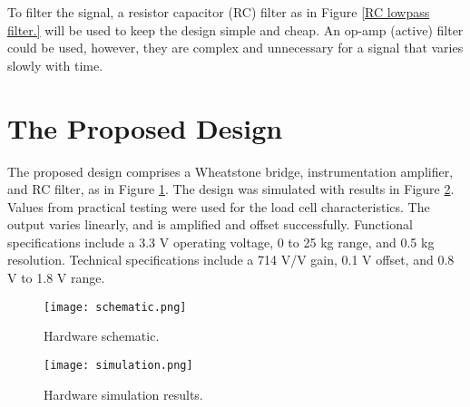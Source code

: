 To filter the signal, a resistor capacitor (RC) filter as in Figure \ref{RC lowpass filter.} will be used to keep the design simple and cheap. An op-amp (active) filter could be used, however, they are complex and unnecessary for a signal that varies slowly with time.


\section{The Proposed Design}

The proposed design comprises a Wheatstone bridge, instrumentation amplifier, and RC filter, as in Figure \ref{fig:schematic}. The design was simulated with results in Figure \ref{fig:simulation}. Values from practical testing were used for the load cell characteristics. The output varies linearly, and is amplified and offset successfully. Functional specifications include a 3.3 V operating voltage, 0 to 25 kg range, and 0.5 kg resolution. Technical specifications include a 714 V/V gain, 0.1 V offset, and 0.8 V to 1.8 V range.


\begin{figure}[!ht]
	\centering
	\texttt{[image: schematic.png]}
	\caption{Hardware schematic.}
	\label{fig:schematic}
\end{figure}

\begin{figure}[!ht]
	\centering
	\texttt{[image: simulation.png]}
	\caption{Hardware simulation results.}
	\label{fig:simulation}
\end{figure}



